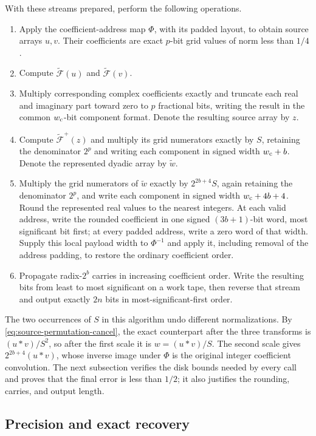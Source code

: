 \documentclass[11pt]{article}
\theoremstyle{definition}
\begin{document}
With these streams prepared, perform the following operations.
\begin{enumerate}
\item Apply the coefficient-address map $\Phi$, with its padded layout, to obtain
source arrays $u,v$.  Their coefficients are exact $p$-bit grid
values of norm less than $1/4$.
\item Compute $\widetilde{\mathscr F}(u)$ and
$\widetilde{\mathscr F}(v)$.
\item Multiply corresponding complex coefficients exactly and truncate
each real and imaginary part toward zero to $p$ fractional bits, writing
the result in the common $w_{\rm c}$-bit component format.
Denote the resulting source array by $z$.
\item Compute $\widetilde{\mathscr F}^{+}(z)$ and multiply its grid
numerators exactly by $S$, retaining the denominator $2^p$ and writing
each component in signed width $w_{\rm c}+b$. Denote the represented
dyadic array by $\widetilde w$.
\item Multiply the grid numerators of $\widetilde w$ exactly by
$2^{2b+4}S$, again retaining the denominator $2^p$, and write each
component in signed width $w_{\rm c}+4b+4$. Round the represented real
values to the nearest integers. At each valid address, write the rounded
coefficient in one signed $(3b+1)$-bit word, most significant bit first;
at every padded address,
write a zero word of that width. Supply this local payload width to
$\Phi^{-1}$ and apply it, including removal of the address padding, to
restore the ordinary coefficient order.
\item Propagate radix-$2^b$ carries in increasing coefficient order.
Write the resulting bits from least to most significant on a work tape,
then reverse that stream and output exactly $2n$ bits in
most-significant-first order.
\end{enumerate}

The two occurrences of $S$ in this algorithm undo different
normalizations.  By \eqref{eq:source-permutation-cancel}, the exact
counterpart after the three transforms is $(u*v)/S^2$, so after the
first scale it is $w=(u*v)/S$.  The second scale gives
$2^{2b+4}(u*v)$, whose inverse image under $\Phi$ is the original
integer coefficient convolution.  The next subsection verifies the
disk bounds needed by every call and proves that the final error is
less than $1/2$; it also justifies the rounding, carries, and output
length.

\subsection{Precision and exact recovery}
\end{document}
